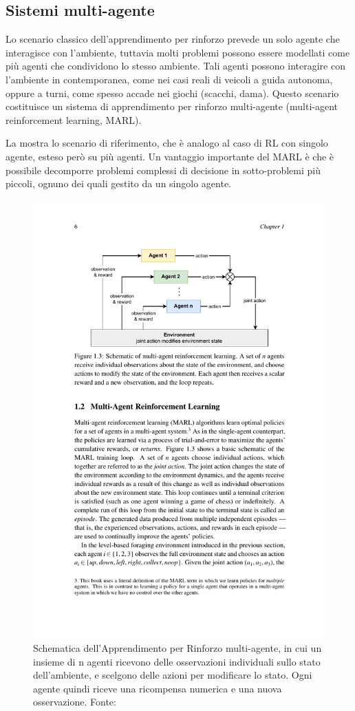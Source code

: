 \subsection{Sistemi multi-agente}

Lo scenario classico dell'apprendimento per rinforzo prevede un solo agente che interagisce con l'ambiente, tuttavia molti problemi possono essere modellati come più agenti che condividono lo stesso ambiente. Tali agenti possono interagire con l'ambiente in contemporanea, come nei casi reali di veicoli a guida autonoma, oppure a turni, come spesso accade nei giochi (scacchi, dama). Questo scenario costituisce un sistema di apprendimento per rinforzo multi-agente (multi-agent reinforcement learning, MARL).

La  mostra lo scenario di riferimento, che è analogo al caso di RL con singolo agente, esteso però su più agenti. Un vantaggio importante del MARL è che è possibile decomporre problemi complessi di decisione in sotto-problemi più piccoli, ognuno dei quali gestito da un singolo agente.

\begin{figure}
    \centering
    \includegraphics[width=0.7\linewidth]{assets/2/rl_multi_agent_schematic.pdf}
    \caption[Schematica dell'Apprendimento per Rinforzo multi-agente]{Schematica dell'Apprendimento per Rinforzo multi-agente, in cui un insieme di n agenti ricevono delle osservazioni individuali sullo stato dell'ambiente, e scelgono delle azioni per modificare lo stato. Ogni agente quindi riceve una ricompensa numerica e una nuova osservazione. Fonte: \cite{Stefano2024}}
    \label{fig:2_rl_multi_agent_schematic}
\end{figure}

